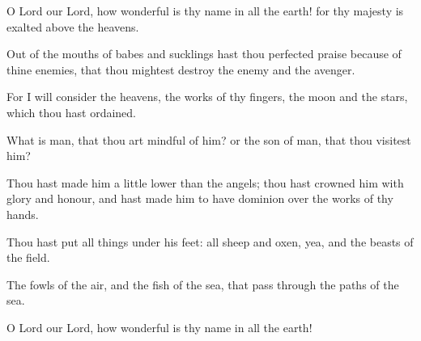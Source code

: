 O Lord our Lord, how wonderful is thy name in all the earth! for thy majesty is exalted above the heavens.

Out of the mouths of babes and sucklings hast thou perfected praise because of thine enemies, that thou mightest destroy the enemy and the avenger.

For I will consider the heavens, the works of thy fingers, the moon and the stars, which thou hast ordained.

What is man, that thou art mindful of him? or the son of man, that thou visitest him?

Thou hast made him a little lower than the angels; thou hast crowned him with glory and honour, and hast made him to have dominion over the works of thy hands.

Thou hast put all things under his feet: all sheep and oxen, yea, and the beasts of the field.

The fowls of the air, and the fish of the sea, that pass through the paths of the sea.

O Lord our Lord, how wonderful is thy name in all the earth!
